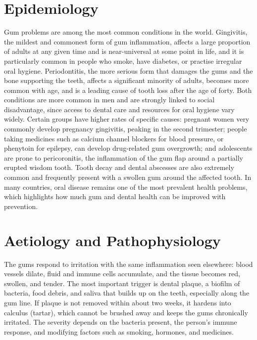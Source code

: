 \section*{Epidemiology}
Gum problems are among the most common conditions in the world. Gingivitis, the mildest and commonest form of gum inflammation, affects a large proportion of adults at any given time and is near-universal at some point in life, and it is particularly common in people who smoke, have diabetes, or practise irregular oral hygiene. Periodontitis, the more serious form that damages the gums and the bone supporting the teeth, affects a significant minority of adults, becomes more common with age, and is a leading cause of tooth loss after the age of forty. Both conditions are more common in men and are strongly linked to social disadvantage, since access to dental care and resources for oral hygiene vary widely. Certain groups have higher rates of specific causes: pregnant women very commonly develop pregnancy gingivitis, peaking in the second trimester; people taking medicines such as calcium channel blockers for blood pressure, or phenytoin for epilepsy, can develop drug-related gum overgrowth; and adolescents are prone to pericoronitis, the inflammation of the gum flap around a partially erupted wisdom tooth. Tooth decay and dental abscesses are also extremely common and frequently present with a swollen gum around the affected tooth. In many countries, oral disease remains one of the most prevalent health problems, which highlights how much gum and dental health can be improved with prevention.

\section*{Aetiology and Pathophysiology}
The gums respond to irritation with the same inflammation seen elsewhere: blood vessels dilate, fluid and immune cells accumulate, and the tissue becomes red, swollen, and tender. The most important trigger is dental plaque, a biofilm of bacteria, food debris, and saliva that builds up on the teeth, especially along the gum line. If plaque is not removed within about two weeks, it hardens into calculus (tartar), which cannot be brushed away and keeps the gums chronically irritated. The severity depends on the bacteria present, the person's immune response, and modifying factors such as smoking, hormones, and medicines.

